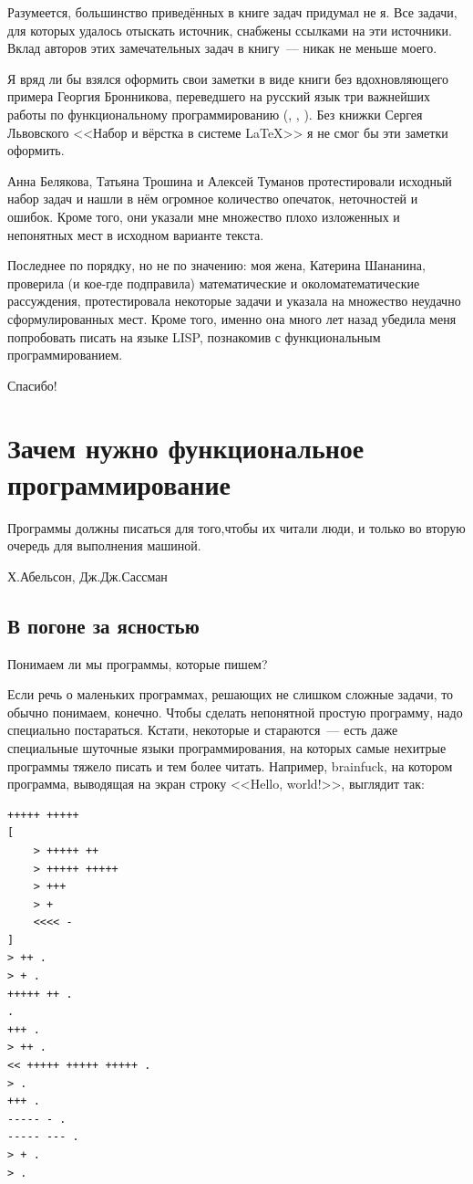 \documentclass[
  paper=a4,
  fontsize=14pt,
  openany,
  appendixprefix=true
]{scrbook}
\begin{document}
Разумеется, большинство приведённых в книге задач придумал не я. Все задачи, для которых удалось отыскать источник, снабжены ссылками на эти источники. Вклад авторов этих замечательных задач в книгу~--- никак не меньше моего.

Я вряд ли бы взялся оформить свои заметки в виде книги без вдохновляющего примера Георгия Бронникова, переведшего на русский язык три важнейших работы по функциональному программированию (\cite{SICP}, \cite{Pierce}, \cite{Okasaki}). Без книжки Сергея Львовского <<Набор и вёрстка в системе \LaTeX>> я не смог бы эти заметки оформить.

Анна Белякова, Татьяна Трошина и Алексей Туманов протестировали исходный набор задач и нашли в нём огромное количество опечаток, неточностей и ошибок. Кроме того, они указали мне множество плохо изложенных и непонятных мест в исходном варианте текста.

Последнее по порядку, но не по значению: моя жена, Катерина Шананина, проверила (и кое-где подправила) математические и околоматематические рассуждения, протестировала некоторые задачи и указала на множество неудачно сформулированных мест. Кроме того, именно она много лет назад убедила меня попробовать писать на языке LISP, познакомив с функциональным программированием.

Спасибо!

\chapter{Зачем нужно функциональное программирование}

\epigraph{Программы должны писаться для того,чтобы их читали люди, и только во вторую очередь для выполнения машиной.}{Х.Абельсон, Дж.Дж.Сассман}

\section{В погоне за ясностью}

Понимаем ли мы программы, которые пишем?

Если речь о маленьких программах, решающих не слишком сложные задачи, то обычно понимаем, конечно. Чтобы сделать непонятной простую программу, надо специально постараться. Кстати, некоторые и стараются~--- есть даже специальные шуточные языки программирования, на которых самые нехитрые программы тяжело писать и тем более читать. Например, brainfuck, на котором программа, выводящая на экран строку <<Hello, world!>>, выглядит так:
\begin{verbatim}
+++++ +++++
[
    > +++++ ++
    > +++++ +++++
    > +++
    > +
    <<<< -
]
> ++ .
> + .
+++++ ++ .
.
+++ .
> ++ .
<< +++++ +++++ +++++ .
> .
+++ .
----- - .
----- --- .
> + .
> .
\end{verbatim}
\end{document}
